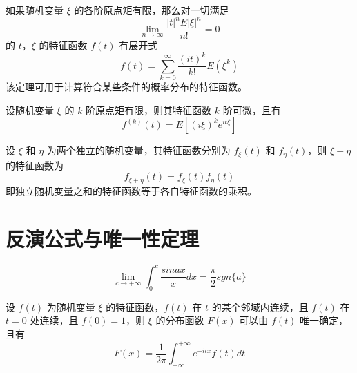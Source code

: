 \documentclass[12pt,a4paper]{amsart}
\begin{document}
\begin{proposition}
    如果随机变量 $\xi$ 的各阶原点矩有限，那么对一切满足
    \begin{equation}
        \lim\limits_{n\to\infty} \frac{|t|^nE|\xi|^n}{n!} = 0
    \end{equation}
    的 $t$，$\xi$ 的特征函数 $f(t)$ 有展开式
    \begin{equation}
        f(t) = \sum_{k=0}^{\infty} \frac{(it)^k}{k!} E(\xi^k)
    \end{equation}
    该定理可用于计算符合某些条件的概率分布的特征函数。
\end{proposition}

\begin{proposition}
    设随机变量 $\xi$ 的 $k$ 阶原点矩有限，则其特征函数 $k$ 阶可微，且有
    \begin{equation}
        f^{(k)}(t) = E\left[(i\xi)^k e^{it\xi}\right]
    \end{equation}
\end{proposition}

\begin{proposition}[独立随机变量之和]
    设 $\xi$ 和 $\eta$ 为两个独立的随机变量，其特征函数分别为 $f_{\xi}(t)$ 和 $f_{\eta}(t)$，则 $\xi + \eta$ 的特征函数为
    \begin{equation}
        f_{\xi+\eta}(t) = f_{\xi}(t)f_{\eta}(t)
    \end{equation}
    即独立随机变量之和的特征函数等于各自特征函数的乘积。
\end{proposition}

\section{反演公式与唯一性定理}

\begin{lemma}
    \begin{equation}
        \lim\limits_{c\to+\infty} \int_0^c \frac{sin ax}{x} dx = \frac{\pi}{2} sgn\{a\}
    \end{equation}
\end{lemma}

\begin{theorem}[反演公式]
    设 $f(t)$ 为随机变量 $\xi$ 的特征函数，$f(t)$ 在 $t$ 的某个邻域内连续，且 $f(t)$ 在 $t=0$ 处连续，且 $f(0) = 1$，则 $\xi$ 的分布函数 $F(x)$ 可以由 $f(t)$ 唯一确定，且有
    \begin{equation}
        F(x) = \frac{1}{2\pi} \int_{-\infty}^{+\infty} e^{-itx} f(t) dt
    \end{equation}
\end{theorem}
\end{document}
